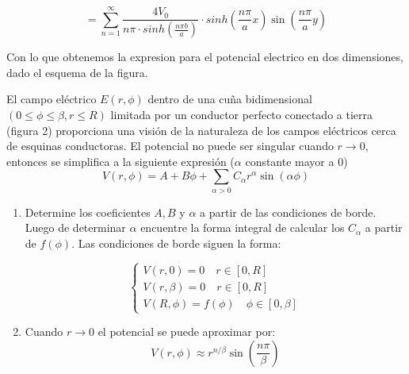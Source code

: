 \documentclass[
  11pt,
  letterpaper,
   addpoints,
   answers
  ]{exam}
\begin{document}
\begin{questions}
\begin{solution}
\begin{enumerate}
\begin{equation}
            = \sum_{n=1}^{\infty}\frac{4V_{0}}{n \pi \cdot sinh\left(\frac{n\pi b}{a}\right)} \cdot sinh\left(\frac{n\pi}{a}x\right)\sin\left(\frac{n\pi}{a}y\right)
        \end{equation}
        \end{enumerate}
        Con lo que obtenemos la expresion para el potencial electrico en dos dimensiones, dado el esquema de la figura.
    \end{solution}
    \question  El campo eléctrico \( E(r, \phi) \) dentro de una cuña bidimensional \( (0 \leq \phi \leq \beta, r \leq R) \) limitada por un conductor perfecto conectado a tierra (figura 2) proporciona una visión de la naturaleza de los campos eléctricos cerca de esquinas conductoras. El potencial no puede ser singular cuando \( r \rightarrow 0 \), entonces se simplifica a la siguiente expresión (\( \alpha \) constante mayor a 0)
    \begin{equation}
        V (r, \phi) = A + B\phi + \sum_{\alpha > 0} C_{\alpha} r^{\alpha} \sin(\alpha \phi)
    \end{equation}
    \begin{enumerate}
        \item Determine los coeficientes \( A, B \) y \( \alpha \) a partir de las condiciones de borde. Luego de determinar \( \alpha \) encuentre la forma integral de calcular los \( C_{\alpha} \) a partir de \( f(\phi) \). Las condiciones de borde siguen la forma:
        
        \begin{equation}
            \left\{
            \begin{array}{l}
            V (r, 0) = 0 \quad r \in [0, R] \\
            V (r, \beta) = 0 \quad r \in [0, R] \\
            V (R, \phi) = f(\phi) \quad \phi \in [0, \beta]
            \end{array}
            \right.
        \end{equation}
        \item Cuando \( r \rightarrow 0 \) el potencial se puede aproximar por:
        \begin{equation}
            V(r, \phi) \approx r^{n/\beta} \sin\left(\frac{n\pi}{\beta}\right)
        \end{equation}
        

\end{enumerate}
\end{questions}
\end{document}
